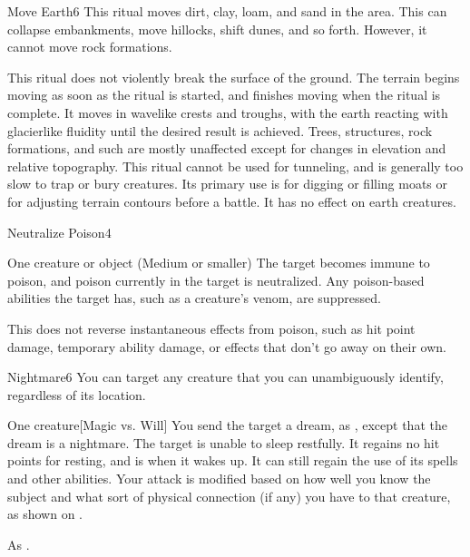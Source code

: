 \begin{spellsection}{Move Earth}{6}
\spellrng{\rnglong}
\spellline
\spelleffect This ritual moves dirt, clay, loam, and sand in the area. This can collapse embankments, move hillocks, shift dunes, and so forth. However, it cannot move rock formations. 

This ritual does not violently break the surface of the ground. The terrain begins moving as soon as the ritual is started, and finishes moving when the ritual is complete. It moves in wavelike crests and troughs, with the earth reacting with glacierlike fluidity until the desired result is achieved. Trees, structures, rock formations, and such are mostly unaffected except for changes in elevation and relative topography.
\spellnotes This ritual cannot be used for tunneling, and is generally too slow to trap or bury creatures. Its primary use is for digging or filling moats or for adjusting terrain contours before a battle. It has no effect on earth creatures.
\end{spellsection}

\begin{spellsection}{Neutralize Poison}{4}
\spelldur \durext \dismissable
\begin{spelltarget}{One creature or object (Medium or smaller)}
    \spelleffect The target becomes immune to poison, and poison currently in the target is neutralized. Any poison-based abilities the target has, such as a creature's venom, are suppressed.
\end{spelltarget}
\spellnotes This does not reverse instantaneous effects from poison, such as hit point damage, temporary ability damage, or effects that don't go away on their own.
\end{spellsection}

\begin{spellsection}{Nightmare}{6}
\spellspecial You can target any creature that you can unambiguously identify, regardless of its location.
\begin{spelltarget}{One creature}[Magic vs. Will]
    \spelleffect You send the target a dream, as , except that the dream is a nightmare.
    \spellsuccess The target is unable to sleep restfully. It regains no hit points for resting, and is \fatigued when it wakes up. It can still regain the use of its spells and other abilities.
    \spellspecial Your attack is modified based on how well you know the subject and what sort of physical connection (if any) you have to that creature, as shown on .
\end{spelltarget}
\spellnotes As .
\end{spellsection}

